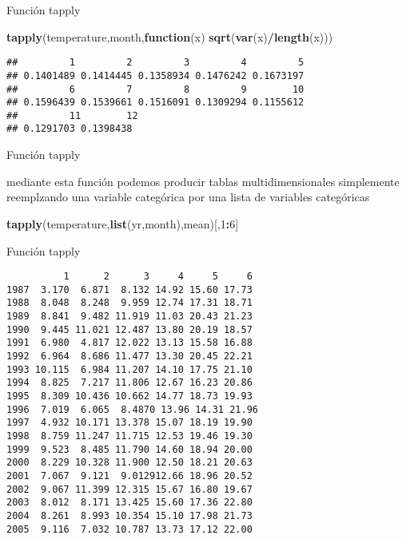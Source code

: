 \documentclass[ignorenonframetext,]{beamer}
\newenvironment{Shaded}{\begin{snugshade}}{\end{snugshade}}
\newcommand{\KeywordTok}[1]{\textcolor[rgb]{0.13,0.29,0.53}{\textbf{#1}}}
\newcommand{\DecValTok}[1]{\textcolor[rgb]{0.00,0.00,0.81}{#1}}
\newcommand{\ControlFlowTok}[1]{\textcolor[rgb]{0.13,0.29,0.53}{\textbf{#1}}}
\newcommand{\OperatorTok}[1]{\textcolor[rgb]{0.81,0.36,0.00}{\textbf{#1}}}
\newcommand{\NormalTok}[1]{#1}
\begin{document}
\begin{frame}[fragile]{Función tapply}

\begin{Shaded}
\begin{Highlighting}[]
\KeywordTok{tapply}\NormalTok{(temperature,month,}\ControlFlowTok{function}\NormalTok{(x)}
  \KeywordTok{sqrt}\NormalTok{(}\KeywordTok{var}\NormalTok{(x)}\OperatorTok{/}\KeywordTok{length}\NormalTok{(x)))}
\end{Highlighting}
\end{Shaded}

\begin{verbatim}
##         1         2         3         4         5         
## 0.1401489 0.1414445 0.1358934 0.1476242 0.1673197  
##         6         7         8         9        10
## 0.1596439 0.1539661 0.1516091 0.1309294 0.1155612
##         11        12 
## 0.1291703 0.1398438

\end{verbatim}

\end{frame}




\begin{frame}[fragile]{Función tapply}

mediante esta función podemos producir tablas multidimensionales
simplemente reemplzando una variable categórica por una lista de
variables categóricas

\begin{Shaded}
\begin{Highlighting}[]
\KeywordTok{tapply}\NormalTok{(temperature,}\KeywordTok{list}\NormalTok{(yr,month),mean)[,}\DecValTok{1}\OperatorTok{:}\DecValTok{6}\NormalTok{]}
\end{Highlighting}
\end{Shaded}

\end{frame}

\begin{frame}[fragile]{Función tapply}

\begin{verbatim}
          1      2      3     4     5     6
1987  3.170  6.871  8.132 14.92 15.60 17.73
1988  8.048  8.248  9.959 12.74 17.31 18.71
1989  8.841  9.482 11.919 11.03 20.43 21.23
1990  9.445 11.021 12.487 13.80 20.19 18.57
1991  6.980  4.817 12.022 13.13 15.58 16.88
1992  6.964  8.686 11.477 13.30 20.45 22.21
1993 10.115  6.984 11.207 14.10 17.75 21.10
1994  8.825  7.217 11.806 12.67 16.23 20.86
1995  8.309 10.436 10.662 14.77 18.73 19.93
1996  7.019  6.065  8.4870 13.96 14.31 21.96
1997  4.932 10.171 13.378 15.07 18.19 19.90
1998  8.759 11.247 11.715 12.53 19.46 19.30
1999  9.523  8.485 11.790 14.60 18.94 20.00
2000  8.229 10.328 11.900 12.50 18.21 20.63
2001  7.067  9.121  9.012912.66 18.96 20.52
2002  9.067 11.399 12.315 15.67 16.80 19.67
2003  8.012  8.171 13.425 15.60 17.36 22.80
2004  8.261  8.993 10.354 15.10 17.98 21.73
2005  9.116  7.032 10.787 13.73 17.12 22.00
\end{verbatim}

\end{frame}
\end{document}
